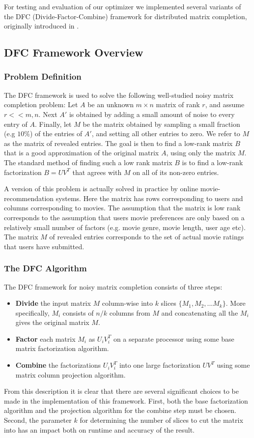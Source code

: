 For testing and evaluation of our optimizer we implemented several variants of the DFC (Divide-Factor-Combine) framework for distributed matrix completion, originally introduced in \cite{Ameet}.

\subsection{DFC Framework Overview}
\subsubsection{Problem Definition}
The DFC framework is used to solve the following well-studied noisy matrix completion problem: Let $A$ be an unknown $m\times n$ matrix of rank $r$, and assume $r<<m,n$. Next $A'$ is obtained by adding a small amount of noise to every entry of $A$. Finally, let $M$ be the matrix obtained by sampling a small fraction (e.g $10\%$) of the entries of $A'$, and setting all other entries to zero. We refer to $M$ as the matrix of revealed entries. The goal is then to find a low-rank matrix $B$ that is a good approximation of the original matrix $A$, using only the matrix $M$. The standard method of finding such a low rank matrix $B$ is to find a low-rank factorization $B=UV^T$ that agrees with $M$ on all of its non-zero entries.

A version of this problem is actually solved in practice by online movie-recommendation systems. Here the matrix has rows corresponding to users and columns corresponding to movies. The assumption that the matrix is low rank corresponds to the assumption that users movie preferences are only based on a relatively small number of factors (e.g. movie genre, movie length, user age etc). The matrix $M$ of revealed entries corresponds to the set of actual movie ratings that users have submitted.

\subsubsection{The DFC Algorithm}
The DFC framework for noisy matrix completion consists of three steps:
\begin{itemize}
\item \textbf{Divide} the input matrix $M$ column-wise into $k$ slices $\{M_1,M_2,...M_k\}$. More specifically, $M_i$ consists of $n/k$ columns from $M$ and concatenating all the $M_i$ gives the original matrix $M$.
\item \textbf{Factor} each matrix $M_i$ as $U_i V_i^T$ on a separate processor using some base matrix factorization algorithm.
\item \textbf{Combine} the factorizations $U_iV_i^T$ into one large factorization $UV^T$ using some matrix column projection algorithm.
\end{itemize}
From this description it is clear that there are several significant choices to be made in the implementation of this framework. First, both the base factorization algorithm and the projection algorithm for the combine step must be chosen. Second, the parameter $k$ for determining the number of slices to cut the matrix into has an impact both on runtime and accuracy of the result.

